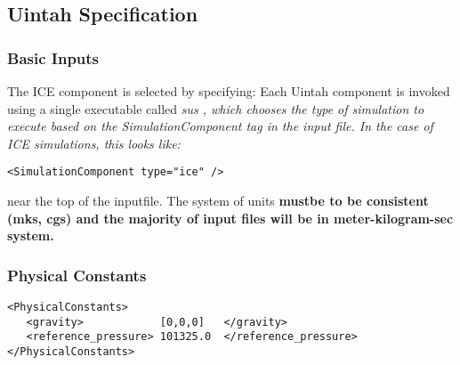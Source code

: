 \subsection{Uintah Specification}
\subsubsection{Basic Inputs}
The ICE component is selected by specifying:
%
Each Uintah component is invoked using a single executable called
\it sus \normalfont, which chooses the type of simulation
to execute based on the \it SimulationComponent \normalfont tag in the
input file.  In the case of ICE simulations, this looks like:

\begin{Verbatim}[fontsize=\footnotesize]
 <SimulationComponent type="ice" />
\end{Verbatim}
%
near the top of the inputfile.  The system of units \bf{must}\normalfont be
to be consistent (mks, cgs) and the majority of input files will be in meter-kilogram-sec
system.

\subsubsection{Physical Constants}

\begin{Verbatim}[fontsize=\footnotesize]
<PhysicalConstants>
   <gravity>            [0,0,0]   </gravity>
   <reference_pressure> 101325.0  </reference_pressure>
</PhysicalConstants>
\end{Verbatim}

